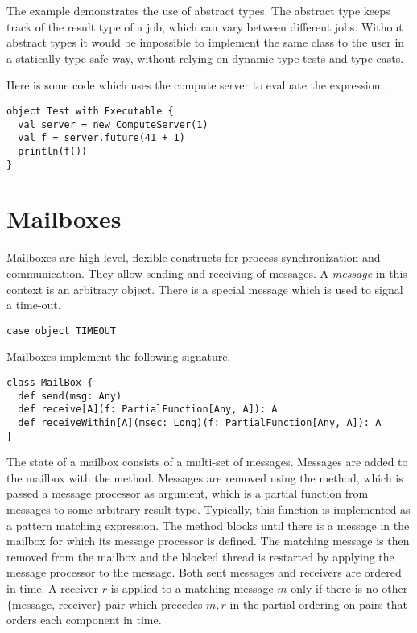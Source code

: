 {The example demonstrates the use of abstract types. The abstract type
 keeps track of the result type of a job, which can vary
between different jobs. Without abstract types it would be impossible
to implement the same class to the user in a statically type-safe
way, without relying on dynamic type tests and type casts.


Here is some code which uses the compute server to evaluate 
the expression .
\begin{lstlisting}
object Test with Executable {
  val server = new ComputeServer(1)
  val f = server.future(41 + 1)
  println(f())
}
\end{lstlisting}

\section{Mailboxes}
\label{sec:mailbox}

Mailboxes are high-level, flexible constructs for process
synchronization and communication. They allow sending and receiving of
messages. A {\em message} in this context is an arbitrary object.
There is a special message  which is used to signal a
time-out.
\begin{lstlisting}
case object TIMEOUT
\end{lstlisting}
Mailboxes implement the following signature.
\begin{lstlisting}
class MailBox {
  def send(msg: Any)
  def receive[A](f: PartialFunction[Any, A]): A
  def receiveWithin[A](msec: Long)(f: PartialFunction[Any, A]): A
}
\end{lstlisting}
The state of a mailbox consists of a multi-set of messages.
Messages are added to the mailbox with the  method. Messages
are removed using the  method, which is passed a message
processor  as argument, which is a partial function from
messages to some arbitrary result type. Typically, this function is
implemented as a pattern matching expression. The 
method blocks until there is a message in the mailbox for which its
message processor is defined.  The matching message is then removed
from the mailbox and the blocked thread is restarted by applying the
message processor to the message. Both sent messages and receivers are
ordered in time. A receiver $r$ is applied to a matching message $m$
only if there is no other $\{$message, receiver$\}$ pair which precedes ${m,
r}$ in the partial ordering on pairs that orders each component in
time.

}
